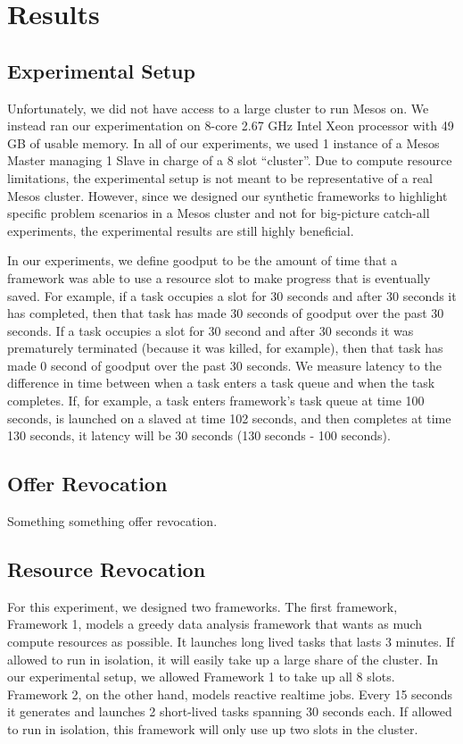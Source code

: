 \section{Results}
\label{sec:results}



\subsection{Experimental Setup}
Unfortunately, we did not have access to a large cluster to run Mesos on. We instead ran our
experimentation on 8-core 2.67 GHz Intel Xeon processor with 49 GB of usable memory. In all of our
experiments, we used 1 instance of a Mesos Master managing 1 Slave in charge of a 8 slot ``cluster''.
Due to compute resource limitations, the experimental setup is not meant to be representative of a real
Mesos cluster. However, since we designed our synthetic frameworks to highlight specific problem 
scenarios in a Mesos cluster and not for big-picture catch-all experiments, the experimental results
are still highly beneficial.

In our experiments, we define goodput to be the amount of time that a framework was able to use a
resource slot to make progress that is eventually saved. For example, if a task occupies a slot for
30 seconds and after 30 seconds it has completed, then that task has made 30 seconds of goodput over
the past 30 seconds. If a task occupies a slot for 30 second and after 30 seconds it was prematurely
terminated (because it was killed, for example), then that task has made 0 second of goodput over the
past 30 seconds. We measure latency to the difference in time between when a task enters a task queue
and when the task completes. If, for example, a task enters framework's task queue at time 100 seconds,
is launched on a slaved at time 102 seconds, and then completes at time 130 seconds, it latency will be
30 seconds (130 seconds - 100 seconds). 

\subsection{Offer Revocation}
Something something offer revocation.

\subsection{Resource Revocation}
For this experiment, we designed two frameworks. The first framework, Framework 1, models a greedy
data analysis framework that wants as much compute resources as possible. It launches long lived tasks
that lasts 3 minutes. If allowed to run in isolation, it will easily take up a large share of the 
cluster. In our experimental setup, we allowed Framework 1 to take up all 8 slots. Framework 2, on the
other hand, models reactive realtime jobs. Every 15 seconds it generates and launches 2 short-lived 
tasks spanning 30 seconds each. If allowed to run in isolation, this framework will only use up two 
slots in the cluster. 

